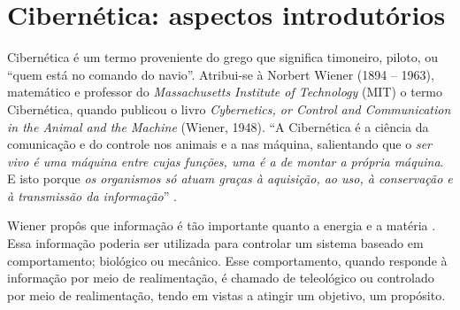 \pagebreak

\section{Cibernética: aspectos introdutórios}

Cibernética é um termo proveniente do grego que significa timoneiro, piloto, ou ``quem está no comando do navio''.
Atribui-se à Norbert Wiener (1894 -- 1963), matemático e professor do \textit{Massachusetts Institute of Technology} (MIT) o termo Cibernética, quando publicou o livro 
\textit{Cybernetics, or Control and Communication in the Animal and the Machine} (Wiener, 1948).
``A Cibernética é a ciência da comunicação e do controle nos animais e a nas máquina, salientando que o \textit{ser vivo é uma máquina entre 
cujas funções, uma é a de montar a própria máquina}. E isto porque \textit{os organismos só atuam graças à aquisição, ao uso, à conservação 
e à transmissão da informação}''  \cite{Maltez1991}.

Wiener propôs que informação é tão importante quanto a energia e a matéria \cite{Salles2007}. Essa informação poderia ser utilizada para controlar um sistema baseado em 
comportamento; biológico ou mecânico. Esse comportamento, quando responde à informação por meio de realimentação, é chamado de teleológico ou controlado por meio de 
realimentação, tendo em vistas a atingir um objetivo, um propósito.




